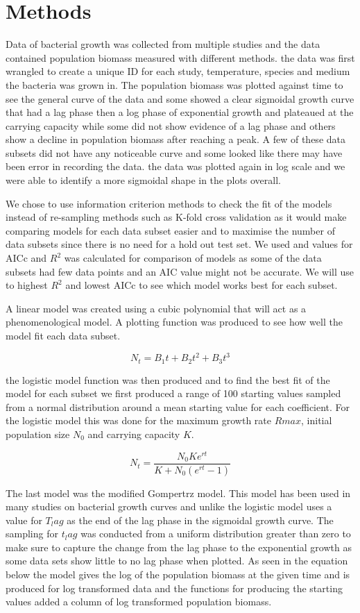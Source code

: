 \documentclass[11pt]{article}
\begin{document}
\section{Methods}

Data of bacterial growth was collected from multiple studies and the data contained population biomass measured with different methods. the data was first wrangled to create a unique ID for each study, temperature, species and medium the bacteria was grown in. The population biomass was plotted against time to see the general curve of the data and some showed a clear sigmoidal growth curve that had a lag phase then a log phase of exponential growth and plateaued at the carrying capacity while some did not show evidence of a lag phase and others show a decline in population biomass after reaching a peak. A few of these data subsets did not have any noticeable curve and some looked like there may have been error in recording the data. the data was plotted again in log scale and we were able to identify a more sigmoidal shape in the plots overall.

We chose to use information criterion methods to check the fit of the models instead of re-sampling methods such as K-fold cross validation as it would make comparing models for each data subset easier and to maximise the number of data subsets since there is no need for a hold out test set. We used and values for AICc and $R^2$ was calculated for comparison of models as some of the data subsets had few data points and an AIC value might not be accurate\cite{Burnham2002ModelApproach}. We will use to highest $R^2$ and lowest AICc to see which model works best for each subset. 

A linear model was created using a cubic polynomial that will act as a phenomenological model. A plotting function was produced to see how well the model fit each data subset.

\[
      N_t = B_1t + B_2t^2 + B_3t^3
\]

the logistic model function was then produced and to find the best fit of the model for each subset we first produced a range of 100 starting values sampled from a normal distribution around a mean starting value for each coefficient. For the logistic model this was done for the maximum growth rate $Rmax$, initial population size $N_0$ and carrying capacity $K$. 

\[
      N_t = \frac{N_0Ke^{rt}}{K + N_0(e^{rt} -1)} 
\]

The last model was the modified Gompertrz model\cite{Zwietering1990ModelingCurve}. This model has been used in many studies on bacterial growth curves and unlike the logistic model uses a value for $T_lag$ as the end of the lag phase in the sigmoidal growth curve. The sampling for $t_lag$ was conducted from a uniform distribution greater than zero to make sure to capture the change from the lag phase to the exponential growth as some data sets show little to no lag phase when plotted. As seen in the equation below the model gives the log of the population biomass at the given time and is produced for log transformed data and the functions for producing the starting values added a column of log transformed population biomass.
\end{document}
